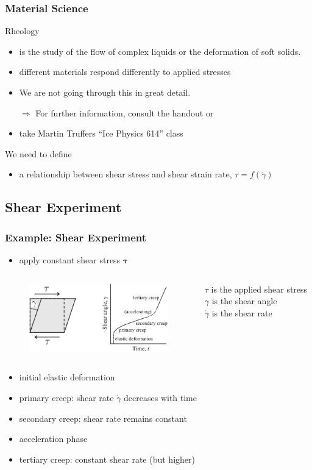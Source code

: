 \documentclass[hide notes,intlimits]{beamer}
\begin{document}
\begin{frame}
  \frametitle{Material Science}
  \begin{block}{Rheology}
    \begin{itemize}
    \item is the study of the flow of complex liquids or the deformation of soft solids.
    \item different materials respond differently to applied stresses
    \item We are not going through this in great detail.
    \item[$\Rightarrow$] For further information, consult the handout or
      \item take Martin Truffers ``Ice Physics 614''  class
    \end{itemize}
  \end{block}
  \begin{block}{We need to define}
    \begin{itemize}
   \item a relationship between shear stress and shear strain rate, $\tau = f(\dot \gamma)$
   \end{itemize}
  \end{block}
\end{frame}


\subsection{Shear Experiment}

\begin{frame}
  \frametitle{Example: Shear Experiment}
  \begin{itemize}
    \item apply constant shear stress $\boldsymbol{\tau}$
\end{itemize}
  \begin{columns}
    \column[c]{8cm}
    \begin{figure}
      \includegraphics[width=6cm]{figures/fig_4_04}
    \end{figure}
    \column[c]{5cm}
    $\tau$ is the applied shear stress\\
    $\gamma$ is the shear angle\\
    $\dot\gamma$ is the shear rate
  \end{columns}
  \begin{itemize}
    \item initial elastic deformation
    \item primary creep: shear rate $\dot\gamma$ decreases with time
    \item \alert{secondary creep}: shear rate remains constant
    \item acceleration phase
    \item tertiary creep: constant shear rate (but higher) 
 \end{itemize}
\end{frame}
\end{document}
